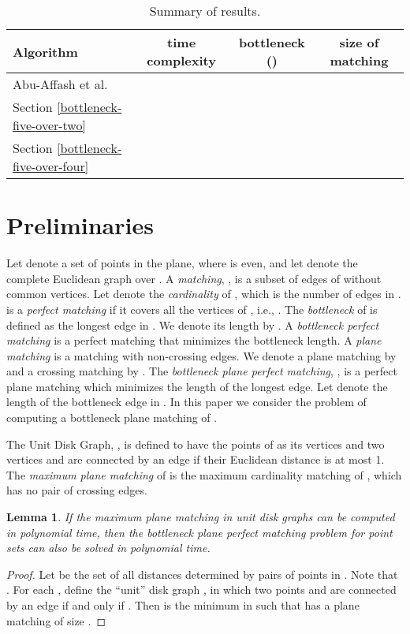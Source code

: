 \documentclass[11pt,a4paper]{article}
\newtheorem{lemma}{Lemma}
\begin{document}
\begin{table}
\centering
\caption{Summary of results.}
\label{table1}
    \begin{tabular}{|l|c|c|c|}
         \hline
             Algorithm &time complexity&bottleneck ()    & size of matching  \\ \hline
             Abu-Affash et al. \cite{Abu-Affash2014}&  &  &  \\
             Section \ref{bottleneck-five-over-two} &&  &  \\
             Section \ref{bottleneck-five-over-four}& &  & \\
         \hline
    \end{tabular}
\end{table}

\section{Preliminaries}
\label{preliminaries}

Let  denote a set of  points in the plane, where  is even, and let  denote the complete Euclidean graph over . A {\em matching}, , is a subset of edges of  without common vertices. Let  denote the {\em cardinality} of , which is the number of edges in .  is a {\em perfect matching} if it covers all the vertices of , i.e., . The {\em bottleneck} of  is defined as the longest edge in . We denote its length by . A {\em bottleneck perfect matching} is a perfect matching that minimizes the bottleneck length. A {\em plane matching} is a matching with non-crossing edges. 
We denote a plane matching by  and a crossing matching by . 
The {\em bottleneck plane perfect matching}, , is a perfect plane matching which minimizes the length of the longest edge. Let  denote the length of the bottleneck edge in . In this paper we consider the problem of computing a bottleneck plane matching of . 

The Unit Disk Graph, , is defined to have the points of  as its vertices and two vertices  and  are connected by an edge if their Euclidean distance  is at most 1. The {\em maximum plane matching} of  is the maximum cardinality matching of , which has no pair of crossing edges. 

\begin{lemma}
 If the maximum plane matching in unit disk graphs can be computed in polynomial time, then the bottleneck plane perfect matching problem for point sets can also be solved in polynomial time.
\end{lemma}
\begin{proof}
Let  be the set of all distances determined by pairs of points in . Note that . For each , define the ``unit'' disk graph , in which two points  and  are connected by an edge if and only if . Then  is the minimum  in  such that  has a plane matching of size .
\end{proof}
\end{document}
